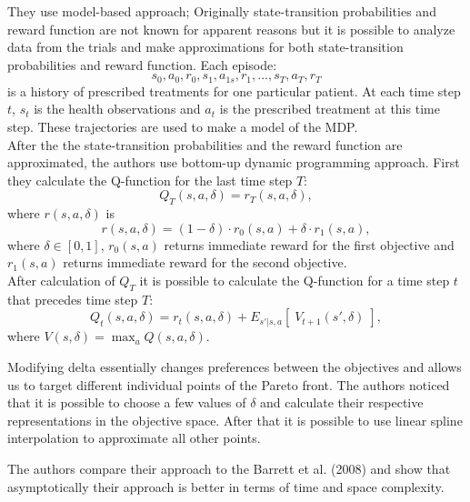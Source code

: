 They use model-based approach; Originally state-transition probabilities and reward function are not known for apparent reasons but it is possible to analyze data from the trials and make approximations for both state-transition probabilities and reward function. Each episode:
$$ s_{0},a_{0},r_{0},s_{1},a_{1s},r_{1}, ... , s_{T},a_{T},r_{T} $$
is a history of prescribed treatments for one particular patient. At each time step $t$, $s_{t}$ is the health observations and $a_{t}$ is the prescribed treatment at this time step. These trajectories are used to make a model of the MDP. \\

After the the state-transition probabilities and the reward function are approximated, the authors use bottom-up dynamic programming approach. First they calculate the Q-function for the last time step $T$:
$$ Q_{T}(s,a,\delta) = r_{T}(s,a,\delta), $$
where $r(s,a,\delta)$ is
$$ r(s,a,\delta) = (1 - \delta) \cdot r_{0}(s,a) + \delta \cdot r_{1}(s,a), $$
where $ \delta \in [0,1] $, $ r_{0}(s,a) $ returns immediate reward for the first objective and $ r_{1}(s,a) $ returns immediate reward for the second objective. \\

After calculation of $ Q_{T} $ it is possible to calculate the Q-function for a time step $ t $ that precedes time step $ T $:
$$ Q_{t}(s,a,\delta) = r_{t}(s,a,\delta) + E_{s'|s,a} \left[\; V_{t+1}(s',\delta)\;\right], $$
where $ V(s,\delta) = \max_a Q(s,a,\delta). $

Modifying delta essentially changes preferences between the objectives and allows us to target different individual points of the Pareto front. The authors noticed that it is possible to choose a few values of $ \delta $ and calculate their respective representations in the objective space. After that it is possible to use linear spline interpolation to approximate all other points.

The authors compare their approach to the Barrett et al. (2008)\nocite{barrett2008learning} and show that asymptotically their approach is better in terms of time and space complexity.


























